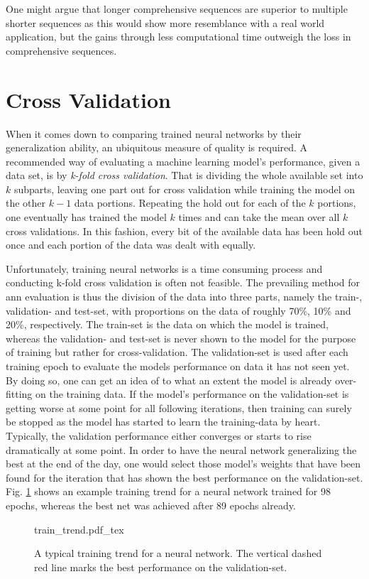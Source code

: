 One might argue that longer comprehensive sequences are superior to multiple shorter sequences as this would show more resemblance with a real world application, but the gains through less computational time outweigh the loss in comprehensive sequences.

\section{Cross Validation}
\label{sec:cv}
When it comes down to comparing trained neural networks by their generalization ability, an ubiquitous measure of quality is required.
A recommended way of evaluating a machine learning model's performance, given a data set, is by \textit{k-fold cross validation}.
That is dividing the whole available set into $k$ subparts, leaving one part out for cross validation while training the model on the other $k-1$ data portions.
Repeating the hold out for each of the $k$ portions, one eventually has trained the model $k$ times and can take the mean over all $k$ cross validations.
In this fashion, every bit of the available data has been hold out once and each portion of the data was dealt with equally.

Unfortunately, training neural networks is a time consuming process and conducting k-fold cross validation is often not feasible.
The prevailing method for \gls{ann} evaluation is thus the division of the data into three parts, namely the train-, validation- and test-set, with proportions on the data of roughly 70\%, 10\% and 20\%, respectively.
The train-set is the data on which the model is trained, whereas the validation- and test-set is never shown to the model for the purpose of training but rather for cross-validation.
The validation-set is used after each training epoch to evaluate the models performance on data it has not seen yet.
By doing so, one can get an idea of to what an extent the model is already over-fitting on the training data.
If the model's performance on the validation-set is getting worse at some point for all following iterations, then training can surely be stopped as the model has started to learn the training-data by heart.
Typically, the validation performance either converges or starts to rise dramatically at some point.
In order to have the neural network generalizing the best at the end of the day, one would select those model's weights that have been found for the iteration that has shown the best performance on the validation-set.
Fig. \ref{fig:traintrend} shows an example training trend for a neural network trained for 98 epochs, whereas the best net was achieved after 89 epochs already.
\begin{figure}
	\centering\small
	\def\svgwidth{0.85\columnwidth}
         {train_trend.pdf_tex}
         \caption{A typical training trend for a neural network. The vertical dashed red line marks the best performance on the validation-set.}
	\label{fig:traintrend}
\end{figure}

